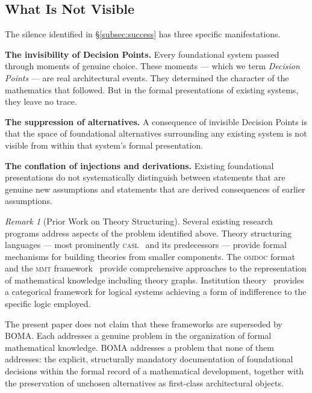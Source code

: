 \documentclass[12pt, a4paper]{article}
\theoremstyle{plain}
\theoremstyle{definition}
\theoremstyle{remark}
\newtheorem{remark}[theorem]{Remark}
\newcommand{\BOMA}{\textsf{BOMA}}
\begin{document}
\subsection{What Is Not Visible}
\label{subsec:invisible}

The silence identified in \S\ref{subsec:success} has three
specific manifestations.

\textbf{The invisibility of Decision Points.}
Every foundational system passed through moments of genuine
choice. These moments --- which we term \emph{Decision Points}
--- are real architectural events. They determined the character
of the mathematics that followed. But in the formal presentations
of existing systems, they leave no trace.

\textbf{The suppression of alternatives.}
A consequence of invisible Decision Points is that the space of
foundational alternatives surrounding any existing system is not
visible from within that system's formal presentation.

\textbf{The conflation of injections and derivations.}
Existing foundational presentations do not systematically
distinguish between statements that are genuine new assumptions
and statements that are derived consequences of earlier
assumptions.

\begin{remark}[Prior Work on Theory Structuring]
\label{rem:prior-work}
Several existing research programs address aspects of the
problem identified above.
Theory structuring languages --- most prominently
\textsc{casl}~\cite{SannellaTarlecki2012} and its predecessors
--- provide formal mechanisms for building theories from smaller
components. The \textsc{omdoc} format and the
\textsc{mmt} framework~\cite{Kohlhase2006,RabeKohlhase2013}
provide comprehensive approaches to the representation of
mathematical knowledge including theory graphs.
Institution theory~\cite{GoguenBurstall1992} provides a
categorical framework for logical systems achieving a form of
indifference to the specific logic employed.

The present paper does not claim that these frameworks are
superseded by \BOMA{}. Each addresses a genuine problem in the
organization of formal mathematical knowledge. \BOMA{} addresses
a problem that none of them addresses: the explicit, structurally
mandatory documentation of foundational decisions within the
formal record of a mathematical development, together with the
preservation of unchosen alternatives as first-class
architectural objects.
\end{remark}
\end{document}
